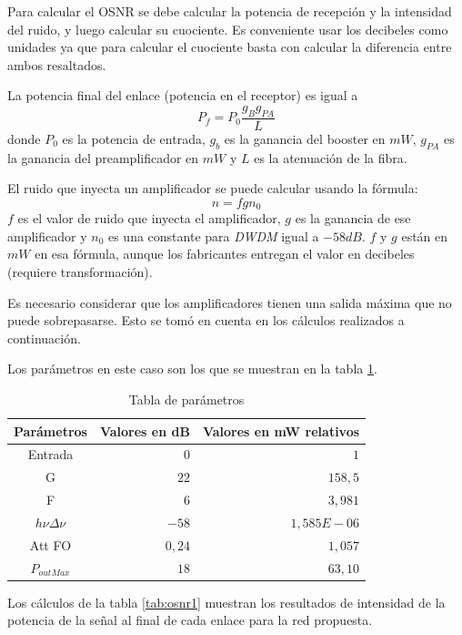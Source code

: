 Para calcular el OSNR se debe calcular la potencia de recepción y la
intensidad del ruido, y luego calcular su cuociente. Es conveniente
usar los decibeles como unidades ya que para calcular el cuociente
basta con calcular la diferencia entre ambos resaltados.

La potencia final del enlace (potencia en el receptor) es igual
a $$P_f=P_0\frac{g_Bg_{PA}}{L}$$ donde $P_0$ es la potencia de
entrada, $g_b$ es la ganancia del booster en $mW$, $g_{PA}$ es la
ganancia del preamplificador en $mW$ y $L$ es la atenuación de la
fibra.

El ruido que inyecta un amplificador se puede calcular usando la
fórmula: $$n = fgn_0$$ $f$ es el valor de ruido que inyecta el
amplificador, $g$ es la ganancia de ese amplificador y $n_0$ es una
constante para \emph{DWDM} igual a $-58 dB$. $f$ y $g$ están en $mW$
en esa fórmula, aunque los fabricantes entregan el valor en decibeles
(requiere transformación).

Es necesario considerar que los amplificadores tienen una salida
máxima que no puede sobrepasarse. Esto se tomó en cuenta en los
cálculos realizados a continuación.

Los parámetros en este caso son los que se muestran en la tabla
\ref{tab:parametros}.

\begin{table}[H]
  \centering
  \begin{tabular}{| c | r | r |}
    \hline
    Parámetros & Valores en dB & Valores en mW relativos \\
    \hline
    Entrada & $0$ & $1$ \\
    G & $22$ & $158,5$ \\
    F & $6$ & $3,981$ \\
    $h \nu \Delta \nu$ & $-58$ & $1,585E-06$ \\
    Att FO & $0,24$ & $1,057$ \\
    $P_{outMax}$ & $18$ & $63,10$ \\
    \hline
  \end{tabular}
  \caption{Tabla de parámetros}
  \label{tab:parametros}
\end{table}

Los cálculos de la tabla \ref{tab:osnr1} muestran los resultados de
intensidad de la potencia de la señal al final de cada enlace para
la red propuesta.

